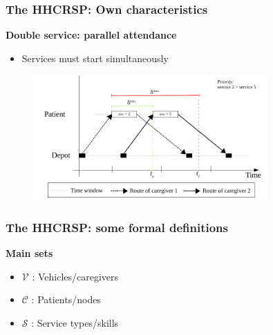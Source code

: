 \begin{frame}
   \frametitle{The HHCRSP: Own characteristics}
   \textbf{Double service: parallel attendance}
   \begin{itemize}
      \item Services must start simultaneously
   \end{itemize}

   \begin{figure}
      \centering
      \includegraphics[width=0.8\textwidth,page=2]{fig/sync-tsn2}
   \end{figure}
\end{frame}

\begin{frame}
   \frametitle{The HHCRSP: some formal definitions}
   \textbf{Main sets}
   \begin{itemize}
      \item $\mathcal{V}$ : Vehicles/caregivers
      \item $\mathcal{C}$ : Patients/nodes
      \item $\mathcal{S}$ : Service types/skills
   \end{itemize}

\end{frame}

